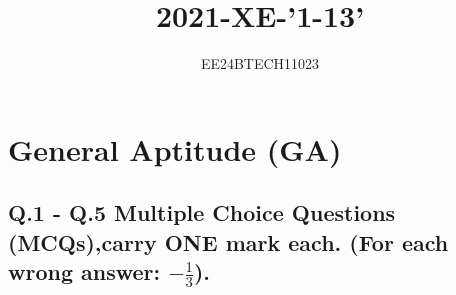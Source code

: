 \documentclass[journal,12pt,onecolumn]{IEEEtran}
\theoremstyle{remark}
\begin{document}

\vspace{3cm}
\title{2021-XE-'1-13'}
\author{EE24BTECH11023}
\maketitle
\section*{General Aptitude (GA)}
\subsection*{Q.1 - Q.5 Multiple Choice Questions (MCQs),carry \textbf{ONE} mark each. (For each wrong answer: $-\frac{1}{3}$).}

{\let\newpage\relax\maketitle}

\renewcommand{\thefigure}{\theenumi}
\renewcommand{\thetable}{\theenumi}
\setlength{\intextsep}{10pt} %
\end{document}
